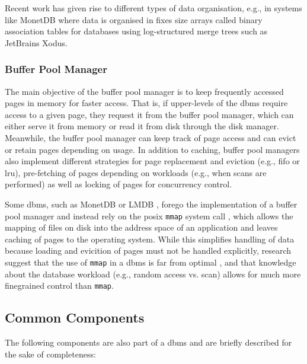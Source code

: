 Recent work has given rise to different types of data organisation, e.g., in systems like MonetDB where data is organised in fixes size arrays called binary association tables \cite{Boncz:2008Breaking} for databases using log-structured merge trees \cite{ONeil:1996The,Sears:2012Blsm} such as JetBrains Xodus.

\subsubsection{Buffer Pool Manager}

The main objective of the buffer pool manager is to keep frequently accessed pages in memory for faster access. That is, if upper-levels of the \acrshort{dbms} require access to a given page, they request it from the buffer pool manager, which can either serve it from memory or read it from disk through the disk manager. Meanwhile, the buffer pool manager can keep track of page access and can evict or retain pages depending on usage. In addition to caching, buffer pool managers also implement different strategies for page replacement and eviction (e.g., \acrshort{fifo} or \acrshort{lru}), pre-fetching of pages depending on workloads (e.g., when scans are performed) as well as locking of pages for concurrency control.

Some \acrshort{dbms}, such as MonetDB \cite{Boncz:2008Breaking} or LMDB \cite{Henry:2019Howard}, forego the implementation of a buffer pool manager and instead rely on the \acrshort{posix} \texttt{mmap} system call \cite{Stonebraker:1981Operating}, which allows the mapping of files on disk into the address space of an application and leaves caching of pages to the operating system. While this simplifies handling of data because loading and evicition of pages must not be handled explicitly, research suggest that the use of \texttt{mmap} in a \acrshort{dbms} is far from optimal \cite{Crotty:2022Are}, and that knowledge about the database workload (e.g., random access vs. scan) allows for much more finegrained control than \texttt{mmap}.

\subsection{Common Components}

The following components are also part of a \acrshort{dbms} and are briefly described for the sake of completeness:

